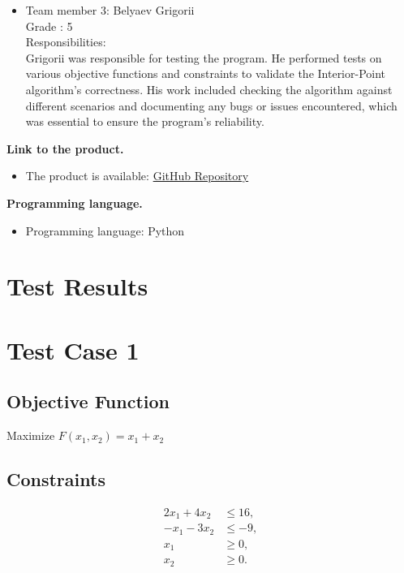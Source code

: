 \documentclass[12pt, legalpaper]{exam}
\begin{document}
\begin{itemize}
    \item Team member 3: Belyaev Grigorii
    \\ Grade : 5
    \\Responsibilities:
    \\Grigorii was responsible for testing the program. He performed tests on various objective functions and constraints to validate the Interior-Point algorithm’s correctness. His work included checking the algorithm against different scenarios and documenting any bugs or issues encountered, which was essential to ensure the program’s reliability.
\end{itemize}
\vspace{12pt}
\noindent     
\textbf{Link to the product.}
\begin{itemize}
    \item The product is available: \href{https://github.com/GodDamnMan/Optimization_prog_2}{GitHub Repository}
\end{itemize}

\vspace{12pt}

\noindent  \textbf{Programming language.}
\begin{itemize}
    \item Programming language:  Python
\end{itemize}

\vspace{12pt}
\newpage
 
\section*{Test Results}
\section*{Test Case 1}
 
\subsection*{Objective Function}
Maximize \( F(x_1, x_2) = x_1 + x_2 \)
 
\subsection*{Constraints}
\begin{align*}
    2x_1 + 4x_2 &\leq 16, \\
    -x_1 - 3x_2 &\leq -9, \\
    x_1 &\geq 0, \\
    x_2 &\geq 0.
\end{align*}
 
\end{document}
